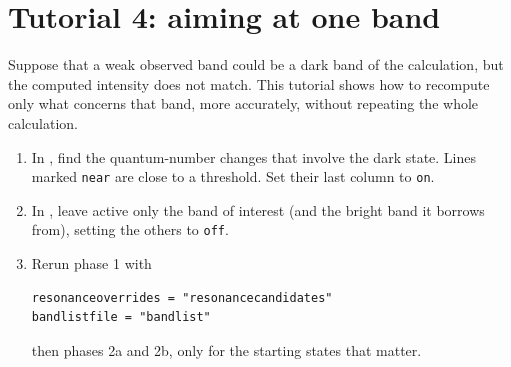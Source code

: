 \chapter{Tutorial 4: aiming at one band}\label{ch:tut-review}

Suppose that a weak observed band could be a dark band of the calculation,
but the computed intensity does not match. This tutorial shows how to
recompute only what concerns that band, more accurately, without
repeating the whole calculation.
\begin{enumerate}
\item In , find the quantum-number changes that
  involve the dark state. Lines marked \texttt{near} are close to a
  threshold. Set their last column to \texttt{on}.
\item In , leave active only the band of interest (and the
  bright band it borrows from), setting the others to \texttt{off}.
\item Rerun phase 1 with
\begin{lstlisting}
resonanceoverrides = "resonancecandidates"
bandlistfile = "bandlist"
\end{lstlisting}
  then phases 2a and 2b, only for the starting states that matter.
\end{enumerate}
